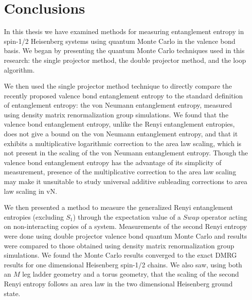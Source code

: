 \documentclass[letterpaper,12pt,titlepage,oneside,final]{report}
\newcommand{\href}[1]{#1} %
\begin{document}


\chapter{Conclusions}
In this thesis we have examined methods for measuring entanglement entropy in spin-1/2 
Heisenberg systems using quantum Monte Carlo in the valence bond basis. We began by 
presenting the quantum Monte Carlo techniques used in this research: the single projector method, the double projector method, and the loop algorithm.

We then used the single projector method 
technique to directly compare the recently proposed valence bond entanglement entropy to 
the standard definition of entanglement entropy: the von Neumann entanglement entropy, measured using density matrix renormalization group simulations. 
We found that the valence bond entanglement entropy, unlike the Renyi entanglement entropies, does not give a bound on the von 
Neumann entanglement entropy, and that it exhibits a multiplicative logarithmic correction 
to the area law scaling, which is not present in the scaling of the von Neumann entanglement entropy. 
Though the valence bond entanglement entropy has the advantage of its simplicity of measurement, presence of the multiplicative correction to the area law scaling may make it unsuitable to study universal additive subleading corrections to area law scaling in vN.

We then presented a method to measure the generalized Renyi entanglement entropies (excluding $S_1$) through the expectation value of a $Swap$ operator acting on non-interacting copies of a system.
Measurements of the second Renyi entropy were done using double projector valence bond quantum Monte Carlo and results were compared to those obtained using density matrix renormalization group simulations.  
We found the Monte Carlo results converged to the exact DMRG results for one dimensional Heisenberg spin-1/2 
chains.
We also saw, using both an $M$ leg ladder geometry and a torus geometry, that the scaling of the second Renyi entropy follows an area law in the two dimensional Heisenberg ground state.
\end{document}
